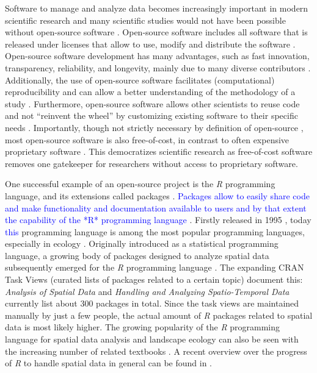 \documentclass[smallextended]{svjour3}       %
\begin{document}
Software to manage and analyze data becomes increasingly important in modern scientific research \cite{Wilson2014} and many scientific studies would not have been possible without open-source software \cite{Prlic2012}.
Open-source software includes all software that is released under licenses that allow to use, modify and distribute the software \cite{St.Laurent2008}.
Open-source software development has many advantages, such as fast innovation, transparency, reliability, and longevity, mainly due to many diverse contributors \cite{vonKrogh2006,St.Laurent2008}.
Additionally, the use of open-source software facilitates (computational) reproducibility and can allow a better understanding of the methodology of a study \cite{Prlic2012,Powers2019}.
Furthermore, open-source software allows other scientists to reuse code and not ``reinvent the wheel'' \cite{Prlic2012} by customizing existing software to their specific needs \cite{Steiniger2009}.
Importantly, though not strictly necessary by definition of open-source \cite{Steiniger2009,Steiniger2009a}, most open-source software is also free-of-cost, in contrast to often expensive proprietary software \cite{vonKrogh2006,Steiniger2009,Steiniger2009a}.
This democratizes scientific research as free-of-cost software removes one gatekeeper for researchers without access to proprietary software.

One successful example of an open-source project is the \emph{R} programming language, and its extensions called packages \cite{RCoreTeam2019}.
\textcolor{blue}{Packages allow to easily share code and make functionality and documentation available to users and by that extent the capability of the *R* programming language \cite{Wickham2015}}.
Firstly released in 1995 \cite{Smith2016}, today \textcolor{blue}{this} programming language is among the most popular programming languages, especially in ecology \cite{Lai2019}.
Originally introduced as a statistical programming language, a growing body of packages designed to analyze spatial data subsequently emerged for the \emph{R} programming language \cite{Bivand2006,Lovelace2019}.
The expanding CRAN Task Views (curated lists of packages related to a certain topic) document this: \emph{Analysis of Spatial Data} \cite{Bivand2019a} and \emph{Handling and Analyzing Spatio-Temporal Data} \cite{Pebesma2020} currently list about 300 packages in total.
Since the task views are maintained manually by just a few people, the actual amount of \emph{R} packages related to spatial data is most likely higher.
The growing popularity of the \emph{R} programming language for spatial data analysis and landscape ecology can also be seen with the increasing number of related textbooks \cite{Wegmann2016,Fletcher2018,Lovelace2019,Pebesma2019a}.
A recent overview over the progress of \emph{R} to handle spatial data in general can be found in \cite{Bivand2020}.
\end{document}
